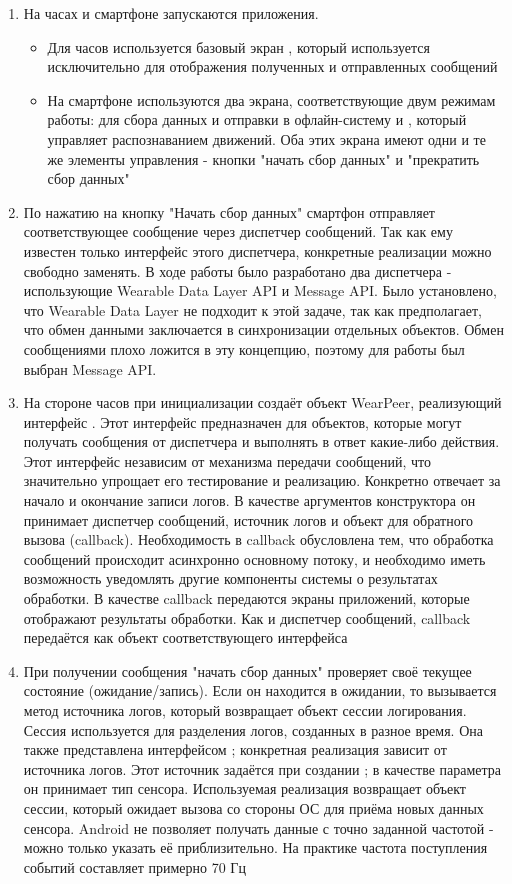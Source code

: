 \begin{enumerate}
\item На часах и смартфоне запускаются приложения.
  \begin{itemize}
  \item  Для часов используется базовый экран , который используется исключительно для отображения полученных и отправленных сообщений
  \item На смартфоне используются два экрана, соответствующие двум режимам работы:  для сбора данных и отправки в офлайн-систему и , который управляет распознаванием движений. Оба этих экрана имеют одни и те же элементы управления - кнопки "начать сбор данных" и "прекратить сбор данных"
  \end{itemize}
\item По нажатию на кнопку "Начать сбор данных" смартфон отправляет соответствующее сообщение через диспетчер сообщений. Так как ему известен только интерфейс этого диспетчера, конкретные реализации можно свободно заменять. В ходе работы было разработано два диспетчера - использующие Wearable Data Layer API и Message API. Было установлено, что Wearable Data Layer не подходит к этой задаче, так как предполагает, что обмен данными заключается в синхронизации отдельных объектов. Обмен сообщениями плохо ложится в эту концепцию, поэтому для работы был выбран Message API.
\item На стороне часов  при инициализации создаёт объект WearPeer, реализующий интерфейс . Этот интерфейс предназначен для объектов, которые могут получать сообщения от диспетчера и выполнять в ответ какие-либо действия. Этот интерфейс независим от механизма передачи сообщений, что значительно упрощает его тестирование и реализацию. Конкретно  отвечает за начало и окончание записи логов. В качестве аргументов конструктора он принимает диспетчер сообщений, источник логов и объект для обратного вызова (callback). Необходимость в callback обусловлена тем, что обработка сообщений происходит асинхронно основному потоку, и необходимо иметь возможность уведомлять другие компоненты системы о результатах обработки. В качестве callback передаются экраны приложений, которые отображают результаты обработки. Как и диспетчер сообщений, callback передаётся как объект соответствующего интерфейса
\item При получении сообщения "начать сбор данных"  проверяет своё текущее состояние (ожидание/запись). Если он находится в ожидании, то вызывается метод источника логов, который возвращает объект сессии логирования. Сессия используется для разделения логов, созданных в разное время. Она также представлена интерфейсом ; конкретная реализация зависит от источника логов. Этот источник задаётся при создании ; в качестве параметра он принимает тип сенсора. Используемая реализация возвращает объект сессии, который ожидает вызова со стороны ОС для приёма новых данных сенсора. Android не позволяет получать данные с точно заданной частотой - можно только указать её приблизительно. На практике частота поступления событий составляет примерно 70 Гц

\end{enumerate}
